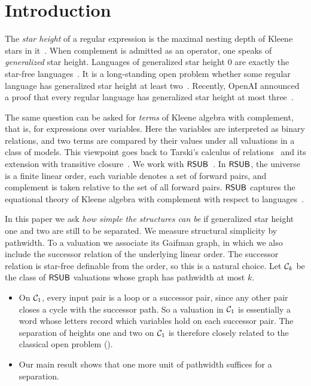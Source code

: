 \section{Introduction}\label{section: introduction}

The \emph{star height} of a regular expression is the maximal nesting depth of Kleene stars in it~\cite{egganTransitionGraphsStarheight1963}.
When complement is admitted as an operator, one speaks of \emph{generalized} star height.
Languages of generalized star height $0$ are exactly the star-free languages~\cite{schutzenbergerFiniteMonoidsHaving1965}.
It is a long-standing open problem whether some regular language has generalized star height at least two~\cite{pinResultsGeneralizedStarheight1992}.
Recently, OpenAI announced a proof that every regular language has generalized star height at most three~\cite{openaiGeneralizedStarHeight2026}.

The same question can be asked for \emph{terms} of Kleene algebra with complement, that is, for expressions over variables.
Here the variables are interpreted as binary relations, and two terms are compared by their values under all valuations in a class of models.
This viewpoint goes back to Tarski's calculus of relations~\cite{tarskiCalculusRelations1941} and its extension with transitive closure~\cite{ngRelationAlgebrasTransitive1984}.
We work with $\mathsf{RSUB}$~\cite{nakamuraFiniteRelationalSemantics2025}.
In $\mathsf{RSUB}$, the universe is a finite linear order, each variable denotes a set of forward pairs, and complement is taken relative to the set of all forward pairs.
$\mathsf{RSUB}$ captures the equational theory of Kleene algebra with complement with respect to languages~\cite{nakamuraFiniteRelationalSemantics2025}.

In this paper we ask \emph{how simple the structures can be} if generalized star height one and two are still to be separated.
We measure structural simplicity by pathwidth.
To a valuation we associate its Gaifman graph, in which we also include the successor relation of the underlying linear order.
The successor relation is star-free definable from the order, so this is a natural choice.
Let $\mathcal{C}_{k}$ be the class of $\mathsf{RSUB}$ valuations whose graph has pathwidth at most $k$.
\begin{itemize}
  \item On $\mathcal{C}_{1}$, every input pair is a loop or a successor pair, since any other pair closes a cycle with the successor path.
        So a valuation in $\mathcal{C}_{1}$ is essentially a word whose letters record which variables hold on each successor pair.
        The separation of heights one and two on $\mathcal{C}_{1}$ is therefore closely related to the classical open problem ().
  \item Our main result shows that one more unit of pathwidth suffices for a separation.
\end{itemize}

